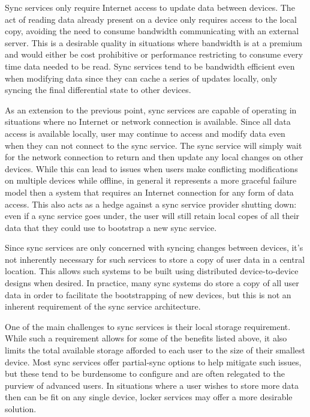 \begin{packed_desc}
\item[Bandwidth Efficient:] Sync services only require Internet access
  to update data between devices. The act of reading data already
  present on a device only requires access to the local copy, avoiding
  the need to consume bandwidth communicating with an external
  server. This is a desirable quality in situations where bandwidth is
  at a premium and would either be cost prohibitive or performance
  restricting to consume every time data needed to be read. Sync
  services tend to be bandwidth efficient even when modifying data
  since they can cache a series of updates locally, only syncing the
  final differential state to other devices.
\item[Offline Support:] As an extension to the previous point, sync
  services are capable of operating in situations where no Internet or
  network connection is available. Since all data access is available
  locally, user may continue to access and modify data even when they
  can not connect to the sync service. The sync service will simply
  wait for the network connection to return and then update any local
  changes on other devices. While this can lead to issues when users
  make conflicting modifications on multiple devices while offline, in
  general it represents a more graceful failure model then a system
  that requires an Internet connection for any form of data
  access. This also acts as a hedge against a sync service provider
  shutting down: even if a sync service goes under, the user will
  still retain local copes of all their data that they could use to
  bootstrap a new sync service.
\item[No Central Storage:] Since sync services are only concerned with
  syncing changes between devices, it's not inherently necessary for
  such services to store a copy of user data in a central
  location. This allows such systems to be built using distributed
  device-to-device designs when desired. In practice, many sync
  systems do store a copy of all user data in order to facilitate the
  bootstrapping of new devices, but this is not an inherent
  requirement of the sync service architecture.
\end{packed_desc}

One of the main challenges to sync services is their local storage
requirement. While such a requirement allows for some of the benefits
listed above, it also limits the total available storage afforded to
each user to the size of their smallest device. Most sync services
offer partial-sync options to help mitigate such issues, but these
tend to be burdensome to configure and are often relegated to the
purview of advanced users. In situations where a user wishes to store
more data then can be fit on any single device, locker services may
offer a more desirable solution.

